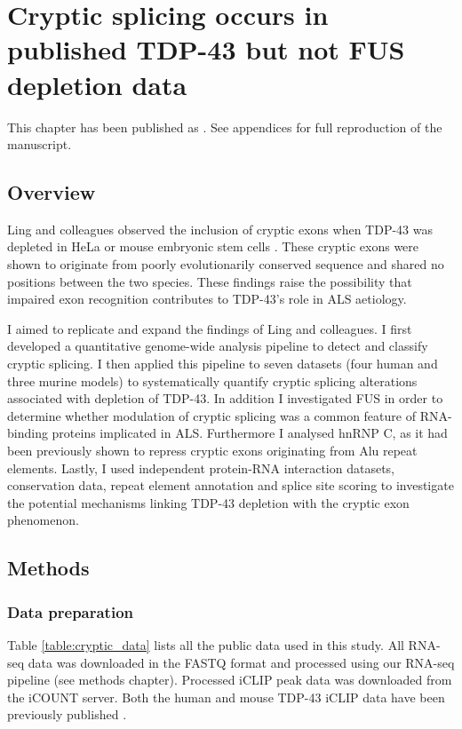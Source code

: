 \chapter{Cryptic splicing occurs in published TDP-43 but not FUS depletion data}
\label{chapter:cryptic_exons}

This chapter has been published as \citep{Humphrey2017}. See appendices for full reproduction of the manuscript.

\section{Overview}

Ling and colleagues observed the inclusion of cryptic exons when TDP-43 was depleted in HeLa or mouse embryonic stem cells \citep{Ling2015}. These cryptic exons were shown to originate from poorly evolutionarily conserved sequence and shared no positions between the two species. These findings raise the possibility that impaired exon recognition contributes to TDP-43's role in ALS aetiology.

I aimed to replicate and expand the findings of Ling and colleagues. I first developed a quantitative genome-wide analysis pipeline to detect and classify cryptic splicing. I then applied this pipeline to seven datasets (four human and three murine models) to systematically quantify cryptic splicing alterations associated with depletion of TDP-43. In addition I investigated FUS in order to determine whether modulation of cryptic splicing was a common feature of RNA-binding proteins implicated in ALS. Furthermore I analysed hnRNP C, as it had been previously shown to repress cryptic exons originating from Alu repeat elements. Lastly, I used independent protein-RNA interaction datasets, conservation data, repeat element annotation and splice site scoring to investigate the potential mechanisms linking TDP-43 depletion with the cryptic exon phenomenon.





\section{Methods}

\subsection{Data preparation}
Table \ref{table:cryptic_data} lists all the public data used in this study. All RNA-seq data was downloaded in the FASTQ format and processed using our RNA-seq pipeline (see methods chapter).
Processed iCLIP peak data was downloaded from the iCOUNT server. Both the human and mouse TDP-43 iCLIP data have been previously published \citep{Tollervey2011,Rogelj2012}.

